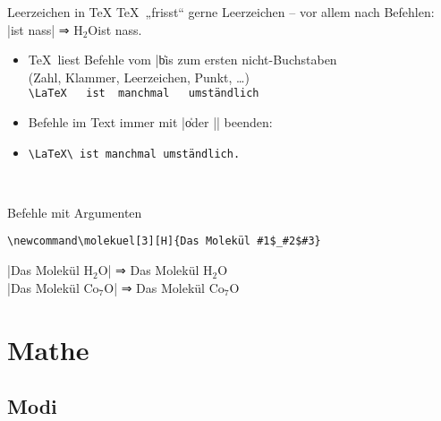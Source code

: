 \documentclass[
	vorläufig=false,
	datum=2022-11-09,
	titel={Mathematiksatz},
	web=false,
	max,
	aspectratio=1610,
]{../tex/latexkurs-slides}
\begin{document}
\begin{frame}[fragile,t]{Leerzeichen in \TeX}
\TeX\ „frisst“ gerne Leerzeichen – vor allem nach Befehlen:\\
|\wasser ist nass| ⇒ H$_2$Oist nass.

\pause
\begin{itemize}
\item<+-> \TeX\ liest Befehle vom |\| bis zum ersten nicht-Buchstaben%
\\ (Zahl, Klammer, Leerzeichen, Punkt, \dots)
\\ \verb*|\LaTeX   ist  manchmal   umständlich|%
\item<+-> Befehle im Text immer mit |\| oder |{}| beenden:
\item<+-> \verb*|\LaTeX\ ist manchmal umständlich.|
\end{itemize}
\begin{olcol}
\begin{block}{}\hfill{%
%
}\hfill\,
\end{block}
\end{olcol}
\end{frame}

\begin{frame}[fragile]{Befehle mit Argumenten}
\begin{lstlisting}
\newcommand\molekuel[3][H]{Das Molekül #1$_#2$#3}
\end{lstlisting}
\newcommand\molekuel[3][H]{Das Molekül #1$_#2$#3}
|\molekuel{2}{O}| ⇒ \molekuel{2}{O}\\
|\molekuel[Co]{7}{O}| ⇒ \molekuel[Co]{7}{O}\\
\end{frame}


\section{Mathe}
\subsection{Modi}
\end{document}
